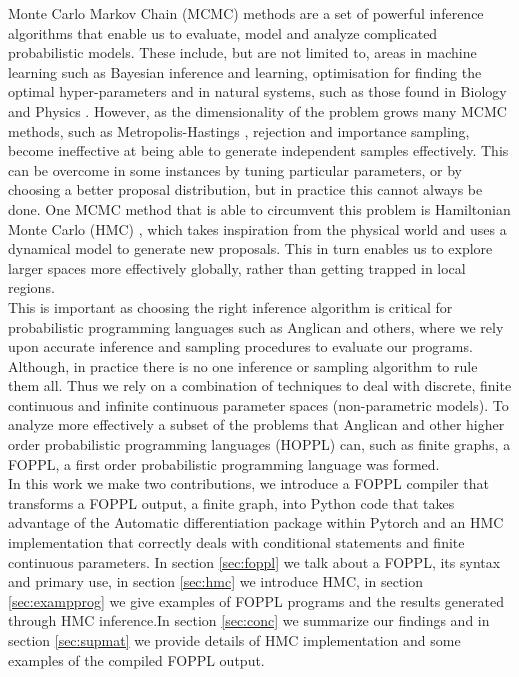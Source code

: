 \documentclass[twoside]{article}
\begin{document}
Monte Carlo Markov Chain (MCMC) methods are a set of powerful inference algorithms \citep{berg2008markov} that enable us to evaluate, model and analyze complicated probabilistic models. These include, but are not limited to, areas in machine learning such as Bayesian inference and learning, optimisation for finding the optimal hyper-parameters \citep{andrieu2003introduction} and in natural systems, such as those found in Biology \citep{sorensen2007likelihood} and Physics \citep{duane1987hybrid}. 
However, as the dimensionality of the problem grows many MCMC methods, such as Metropolis-Hastings \citep{hastings1970monte}, rejection and importance sampling,  become ineffective at being able to generate independent samples effectively. This can be overcome in some instances by tuning particular parameters, or by choosing a better proposal distribution, but in practice this cannot always be done. One MCMC method that is able to circumvent this problem is Hamiltonian Monte Carlo (HMC) \citep{neal2011mcmc}\citep{duane1987hybrid}, which takes inspiration from the physical world and uses a dynamical model to generate new proposals. This in turn enables us to explore larger spaces more effectively globally, rather than getting trapped in local regions. \\
This is important as choosing the right inference algorithm is critical for probabilistic programming languages \citep{tolpin2015probabilistic} such as Anglican \citep{wood2014new} and others, where we rely upon accurate inference and sampling procedures to evaluate our programs. Although, in practice there is no one inference or sampling algorithm to rule them all. Thus we rely on a combination of techniques to deal with discrete, finite continuous and infinite continuous parameter spaces (non-parametric models). To analyze more effectively a subset of the problems that Anglican and other higher order probabilistic programming languages (HOPPL) can, such as finite graphs, a FOPPL, a first order probabilistic programming language was formed.\\

In this work we make two contributions, we introduce a FOPPL compiler that transforms a FOPPL output, a finite graph, into Python code that takes advantage of the Automatic differentiation package within Pytorch \citep{pytorch} and an HMC implementation that correctly deals with conditional statements and finite continuous parameters.
In section \ref{sec:foppl} we talk about a FOPPL, its syntax and primary use, in section \ref{sec:hmc} we introduce HMC, in section \ref{sec:exampprog} we give examples of FOPPL programs and the results generated through HMC inference.In section \ref{sec:conc} we summarize our findings and in section \ref{sec:supmat} we provide details of HMC implementation and some examples of the compiled FOPPL output. 
\end{document}
